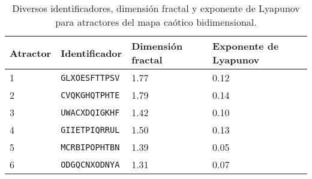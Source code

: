         \begin{table}[htbp]
            \centering
            \caption{Diversos identificadores, dimensión fractal y exponente de Lyapunov para atractores del mapa caótico bidimensional.}
            \begin{tabular}{|l|l|l|l|}
                \hline
                \rowcolor{lightgray}  Atractor & Identificador & Dimensión fractal & Exponente de Lyapunov \\
                \hline
                1     & \verb|GLXOESFTTPSV| & 1.77  & 0.12   \\ %
                \hline
                2     & \verb|CVQKGHQTPHTE| & 1.79  & 0.14   \\ %
                \hline
                3     & \verb|UWACXDQIGKHF| & 1.42  & 0.10   \\ %
                \hline
                4    &  \verb|GIIETPIQRRUL| & 1.50  & 0.13   \\ %
                \hline
                5     & \verb|MCRBIPOPHTBN| & 1.39  & 0.05   \\ %
                \hline
                6     & \verb|ODGQCNXODNYA| & 1.31  & 0.07   \\ %
                \hline
            \end{tabular}
            \label{tab:codificacion}
        \end{table}

